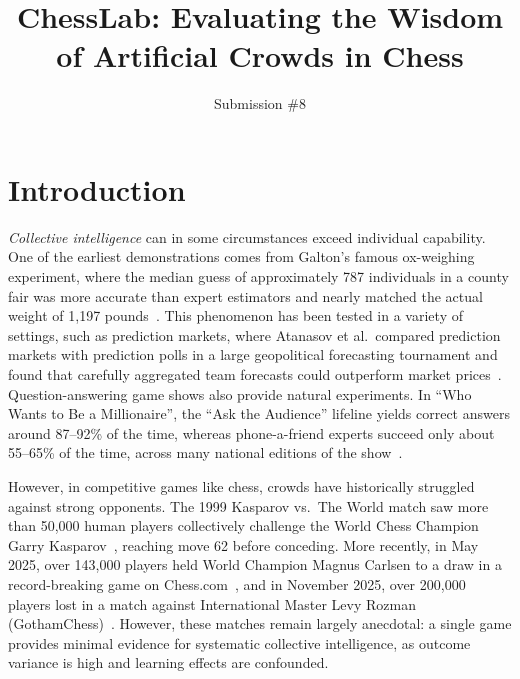 \documentclass[format=acmsmall, review=false]{acmart}
\title[ChessLab: Evaluating Artificial Crowds in Chess]{ChessLab: Evaluating the Wisdom of Artificial Crowds in Chess}
\author{Submission \#8}
\begin{document}

\begin{titlepage}

  \maketitle

\end{titlepage}


\section{Introduction}

\emph{Collective intelligence} can in some circumstances exceed individual capability.
One of the earliest demonstrations comes from Galton's famous ox-weighing experiment, where the median guess of approximately 787 individuals in a county fair was more accurate than expert estimators and nearly matched the actual weight of 1,197 pounds~\cite{galton1907}.
This phenomenon has been tested in a variety of settings, such as prediction markets, where Atanasov et al.\ compared prediction markets with prediction polls in a large geopolitical forecasting tournament and found that carefully aggregated team forecasts could outperform market prices~\cite{atanasov2017}.
Question-answering game shows also provide natural experiments.
In ``Who Wants to Be a Millionaire'', the ``Ask the Audience'' lifeline yields correct answers around 87--92\% of the time, whereas phone-a-friend experts succeed only about 55--65\% of the time, across many national editions of the show~\cite{surowiecki2004}.

However, in competitive games like chess, crowds have historically struggled against strong opponents.
The 1999 Kasparov vs.\ The World match saw more than 50,000 human players collectively challenge the World Chess Champion Garry Kasparov~\cite{kasparov1999}, reaching move 62 before conceding.
More recently, in May 2025, over 143,000 players held World Champion Magnus Carlsen to a draw in a record-breaking game on Chess.com~\cite{chess2025}, and in November 2025, over 200,000 players lost in a match against International Master Levy Rozman (GothamChess)~\cite{gothamchess2025}.
However, these matches remain largely anecdotal: a single game provides minimal evidence for systematic collective intelligence, as outcome variance is high and learning effects are confounded.
\end{document}
